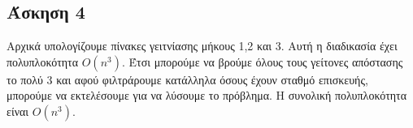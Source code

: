 \subsection*{Άσκηση 4}

Αρχικά υπολογίζουμε πίνακες γειτνίασης μήκους 1,2 και 3. Αυτή η διαδικασία έχει πολυπλοκότητα $O(n^3)$. 
Έτσι μπορούμε να βρούμε όλους τους γείτονες απόστασης το πολύ 3 και αφού φιλτράρουμε κατάλληλα όσους έχουν σταθμό 
επισκευής, μπορούμε να εκτελέσουμε  για να λύσουμε το πρόβλημα. Η συνολική πολυπλοκότητα είναι $O(n^3)$.

